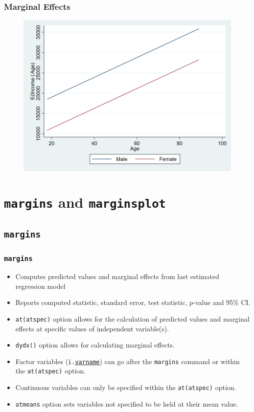 \documentclass{beamer}
\begin{document}
\begin{frame}
	\frametitle{Marginal Effects}
		\begin{figure}[p]
			\centering
			\includegraphics[scale=0.3]{Graphs/mfxOLS.png}
			\label{fig:fig1}
		\end{figure}
\end{frame}

\section{\texttt{margins} and \texttt{marginsplot}}
\subsection{\texttt{margins}}

\begin{frame}
	\frametitle{\texttt{margins}}
	\begin{itemize}
		\item Computes predicted values and marginal effects from last estimated regression model
		\item Reports computed statistic, standard error, test statistic, $p$-value and 95\% CI.
		\item \texttt{at(atspec)} option allows for the calculation of predicted values and marginal effects at specific values of independent variable(s).
		\item \texttt{dydx()} option allows for calculating marginal effects.
		\item Factor variables (\texttt{i.\underline{varname}}) can go after the \texttt{margins} command or within the \texttt{at(atspec)} option.
		\item Continuous variables can only be specified within the \texttt{at(atspec)} option.
		\item \texttt{atmeans} option sets variables not specified to be held at their mean value.
	\end{itemize}
\end{frame}
\end{document}
